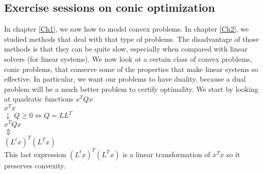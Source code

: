 %
%
%
%
%


\subsection{Exercise sessions on conic optimization}

In chapter \ref{Ch1}, we saw how to model convex problems. In chapter \ref{Ch2}, we studied methods that deal with that type of problems. The disadvantage of those methods is that they can be quite slow, especially when compared with linear solvers (for linear systems). We now look at a certain class of convex problems, conic problems, that conserve some of the properties that make linear systems so effective. In particular, we want our problems to have duality, because a dual problem will be a much better problem to certify optimality. We start by looking at quadratic functions $x^TQx$ \\

\noindent $x^Tx$\\
$\downarrow$ \qquad $Q \geq 0 \Longleftrightarrow Q=LL^T$ \\
$x^TQx$ \\
$\Updownarrow$ \\
$(L^tx)^T(L^Tx)$\\

This last expression $(L^tx)^T(L^Tx)$ is a linear transformation of $x^Tx$ so it preserves convexity.\\

